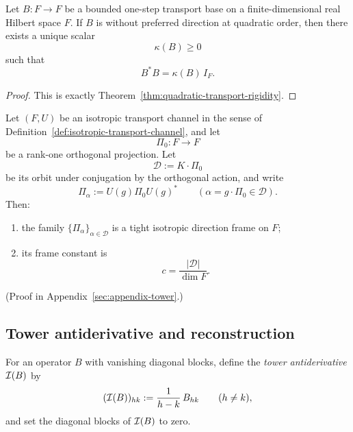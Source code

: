 \begin{corollary}
\label{cor:no-preferred-direction-quadratic-transport}
Let $B:F\to F$ be a bounded one-step transport base on a finite-dimensional
real Hilbert space $F$. If $B$ is without preferred direction at quadratic
order, then there exists a unique scalar
\[
\kappa(B)\ge 0
\]
such that
\[
B^*B=\kappa(B)\,I_F.
\]
\end{corollary}

\begin{proof}
This is exactly Theorem~\ref{thm:quadratic-transport-rigidity}.
\end{proof}

\begin{theorem}
\label{thm:orbit-generated-direction-frame}
Let $(F,U)$ be an isotropic transport channel in the sense of
Definition~\ref{def:isotropic-transport-channel}, and let
\[
\Pi_0:F\to F
\]
be a rank-one orthogonal projection. Let
\[
\mathcal D:=K\cdot \Pi_0
\]
be its orbit under conjugation by the orthogonal action, and write
\[
\Pi_{\alpha}:=U(g)\Pi_0U(g)^*
\qquad
(\alpha=g\cdot \Pi_0\in\mathcal D).
\]
Then:
\begin{enumerate}[label=(\roman*), leftmargin=2em, itemsep=0.2em]
\item the family $\{\Pi_{\alpha}\}_{\alpha\in\mathcal D}$ is a tight isotropic
      direction frame on $F$;
\item its frame constant is
      \[
      c=\frac{|\mathcal D|}{\dim F}.
      \]
\end{enumerate}
\end{theorem}

(Proof in Appendix~\ref{sec:appendix-tower}.)

\subsection{Tower antiderivative and reconstruction}
\label{subsec:tower-antiderivative}

\begin{definition}
\label{def:tower-antiderivative}
For an operator $B$ with vanishing diagonal blocks, define the
\emph{tower antiderivative} $\mathcal{I}(B)$ by
\[
(\mathcal{I}(B))_{h k} :=
\frac{1}{h-k}\, B_{h k}
\qquad (h \neq k),
\]
and set the diagonal blocks of $\mathcal{I}(B)$ to zero.
\end{definition}

